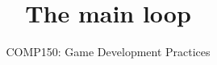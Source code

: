 \usepackage{../../beamerthemeFalmouthGamesAcademy}
\usepackage{multimedia}
\graphicspath{ {../../} }


\usepackage[normalem]{ulem}
\usepackage{wasysym}

\usepackage{pdfpages}


\title{The main loop}   
\subtitle{COMP150: Game Development Practices}

\frame{\titlepage} 





%


